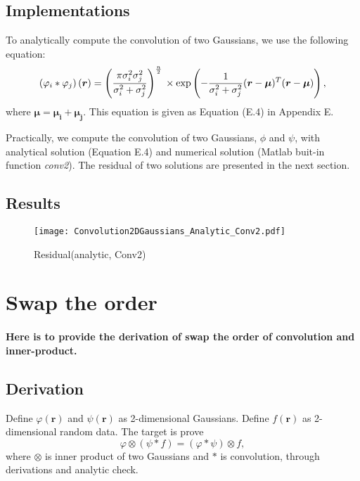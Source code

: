 \documentclass[a4paper, 12pt, english]{article}
\begin{document}
\subsection{Implementations}
To analytically compute the convolution of two Gaussians, we use the following
equation:
$$\left(\varphi_i\ast\varphi_j\right)(\boldsymbol{r}) = \left(\frac{\pi\sigma^2_i\sigma^2_j}{\sigma^2_i + \sigma^2_j}\right)^{\frac{n}{2}}\\
\times\exp\left(-\frac{1}{\sigma^2_i + \sigma^2_j}(\boldsymbol{r}-\boldsymbol{\mu})^T(\boldsymbol{r}-\boldsymbol{\mu})\right), $$
where $\boldsymbol{\mu} = \boldsymbol{\mu_i} + \boldsymbol{\mu_j} $.
This equation is given as Equation (E.4) in Appendix E.\par

Practically, we compute the convolution of two Gaussians, $\phi$ and $\psi $,
with analytical solution (Equation E.4) and numerical solution (Matlab
buit-in function \textit{conv2}).
The residual of two solutions are presented in the next section.


\subsection{Results}
\begin{figure}[H]
\centering
\texttt{[image: Convolution2DGaussians\_Analytic\_Conv2.pdf]}
\caption{Residual(analytic, Conv2)}\label{Convolution2DGaussians_Analytic_Conv2.pdf}
\end{figure}



\newpage

\section{Swap the order}
\paragraph{Here is to provide the derivation of swap the order of convolution and inner-product.}


\subsection{Derivation}
Define $\varphi(\boldsymbol{r}) $ and $\psi(\boldsymbol{r}) $ as 2-dimensional Gaussians.
Define $f(\boldsymbol{r}) $ as 2-dimensional random data. The target is prove
$$ \varphi \otimes (\psi \ast f) = (\varphi \ast \psi) \otimes f,   $$
where $\otimes $ is inner product of two Gaussians and $\ast $ is convolution, through derivations and analytic check.
\end{document}
